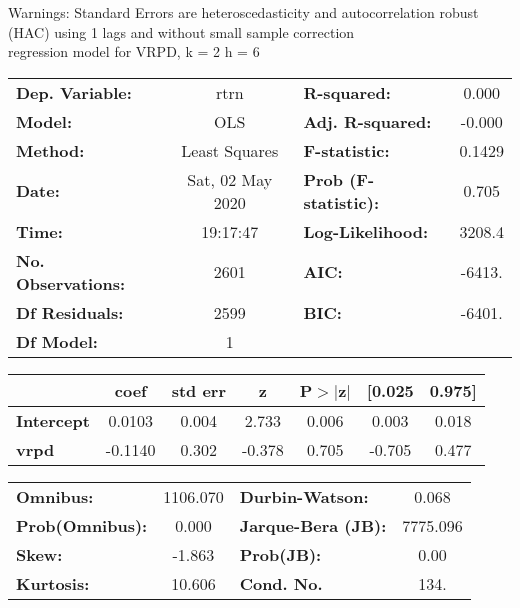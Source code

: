 Warnings: \newline
 [1] Standard Errors are heteroscedasticity and autocorrelation robust (HAC) using 1 lags and without small sample correction\\ 

regression model for VRPD, k = 2 h = 6\begin{center}
\begin{tabular}{lclc}
\toprule
\textbf{Dep. Variable:}    &       rtrn       & \textbf{  R-squared:         } &     0.000   \\
\textbf{Model:}            &       OLS        & \textbf{  Adj. R-squared:    } &    -0.000   \\
\textbf{Method:}           &  Least Squares   & \textbf{  F-statistic:       } &    0.1429   \\
\textbf{Date:}             & Sat, 02 May 2020 & \textbf{  Prob (F-statistic):} &    0.705    \\
\textbf{Time:}             &     19:17:47     & \textbf{  Log-Likelihood:    } &    3208.4   \\
\textbf{No. Observations:} &        2601      & \textbf{  AIC:               } &    -6413.   \\
\textbf{Df Residuals:}     &        2599      & \textbf{  BIC:               } &    -6401.   \\
\textbf{Df Model:}         &           1      & \textbf{                     } &             \\
\bottomrule
\end{tabular}
\begin{tabular}{lcccccc}
                   & \textbf{coef} & \textbf{std err} & \textbf{z} & \textbf{P$> |$z$|$} & \textbf{[0.025} & \textbf{0.975]}  \\
\midrule
\textbf{Intercept} &       0.0103  &        0.004     &     2.733  &         0.006        &        0.003    &        0.018     \\
\textbf{vrpd}      &      -0.1140  &        0.302     &    -0.378  &         0.705        &       -0.705    &        0.477     \\
\bottomrule
\end{tabular}
\begin{tabular}{lclc}
\textbf{Omnibus:}       & 1106.070 & \textbf{  Durbin-Watson:     } &    0.068  \\
\textbf{Prob(Omnibus):} &   0.000  & \textbf{  Jarque-Bera (JB):  } & 7775.096  \\
\textbf{Skew:}          &  -1.863  & \textbf{  Prob(JB):          } &     0.00  \\
\textbf{Kurtosis:}      &  10.606  & \textbf{  Cond. No.          } &     134.  \\
\bottomrule
\end{tabular}
\end{center}

